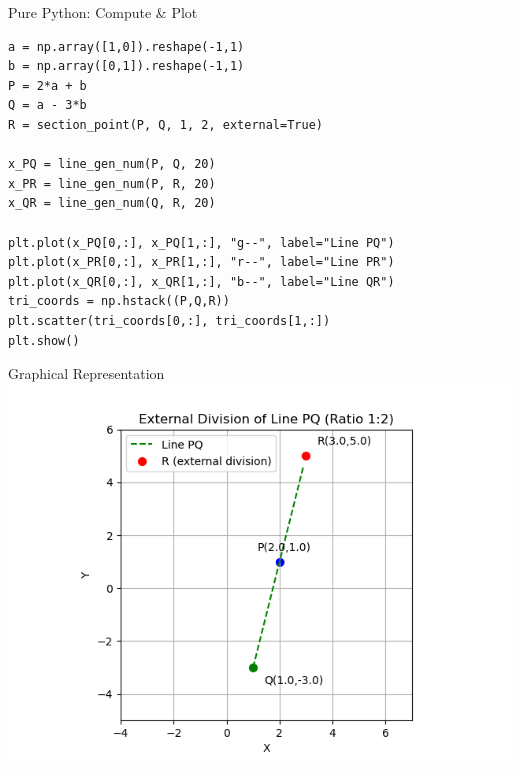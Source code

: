 \documentclass{beamer}
\begin{document}
\begin{frame}[fragile]{Pure Python: Compute \& Plot}
\begin{lstlisting}[style=PyStyle]
a = np.array([1,0]).reshape(-1,1)
b = np.array([0,1]).reshape(-1,1)
P = 2*a + b
Q = a - 3*b
R = section_point(P, Q, 1, 2, external=True)

x_PQ = line_gen_num(P, Q, 20)
x_PR = line_gen_num(P, R, 20)
x_QR = line_gen_num(Q, R, 20)

plt.plot(x_PQ[0,:], x_PQ[1,:], "g--", label="Line PQ")
plt.plot(x_PR[0,:], x_PR[1,:], "r--", label="Line PR")
plt.plot(x_QR[0,:], x_QR[1,:], "b--", label="Line QR")
tri_coords = np.hstack((P,Q,R))
plt.scatter(tri_coords[0,:], tri_coords[1,:])
plt.show()
\end{lstlisting}
\end{frame}
\begin{frame}{Graphical Representation}
    \centering
    \includegraphics[width=0.8\linewidth]{figs/section_graph.png}
    \captionsetup{justification=centering}
\end{frame}
\end{document}
